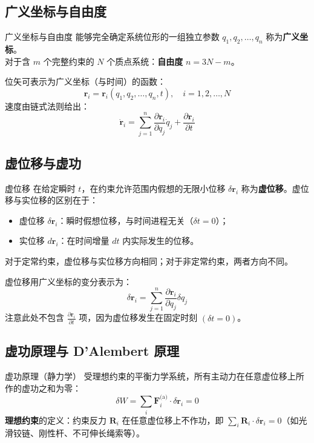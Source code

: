 \subsection{广义坐标与自由度}

\begin{mydefinition}{广义坐标与自由度}
	能够完全确定系统位形的一组独立参数 $q_1, q_2, \ldots, q_n$ 称为\textbf{广义坐标}。\\
	对于含 $m$ 个完整约束的 $N$ 个质点系统：\textbf{自由度} $n = 3N - m$。
\end{mydefinition}

位矢可表示为广义坐标（与时间）的函数：
\[
\mathbf{r}_i = \mathbf{r}_i(q_1, q_2, \ldots, q_n, t), \quad i = 1, 2, \ldots, N
\]
速度由链式法则给出：
\[
\dot{\mathbf{r}}_i = \sum_{j=1}^{n} \frac{\partial \mathbf{r}_i}{\partial q_j} \dot{q}_j + \frac{\partial \mathbf{r}_i}{\partial t}
\]

\subsection{虚位移与虚功}

\begin{mydefinition}{虚位移}
	在给定瞬时 $t$，在约束允许范围内假想的无限小位移 $\delta \mathbf{r}_i$ 称为\textbf{虚位移}。虚位移与实位移的区别在于：
	\begin{itemize}
		\item 虚位移 $\delta \mathbf{r}_i$：瞬时假想位移，与时间进程无关（$\delta t = 0$）；
		\item 实位移 $d\mathbf{r}_i$：在时间增量 $dt$ 内实际发生的位移。
	\end{itemize}
	对于定常约束，虚位移与实位移方向相同；对于非定常约束，两者方向不同。
\end{mydefinition}

虚位移用广义坐标的变分表示为：
\[
\delta \mathbf{r}_i = \sum_{j=1}^{n} \frac{\partial \mathbf{r}_i}{\partial q_j} \delta q_j
\]
注意此处不包含 $\frac{\partial \mathbf{r}_i}{\partial t}$ 项，因为虚位移发生在固定时刻 $(\delta t = 0)$。

\subsection{虚功原理与 D'Alembert 原理}

\begin{theorem}{虚功原理（静力学）}
	受理想约束的平衡力学系统，所有主动力在任意虚位移上所作的虚功之和为零：
	\[
	\delta W = \sum_{i} \mathbf{F}_i^{\text{(a)}} \cdot \delta \mathbf{r}_i = 0
	\]
	\textbf{理想约束}的定义：约束反力 $\mathbf{R}_i$ 在任意虚位移上不作功，即 $\sum_i \mathbf{R}_i \cdot \delta \mathbf{r}_i = 0$（如光滑铰链、刚性杆、不可伸长绳索等）。
\end{theorem}

